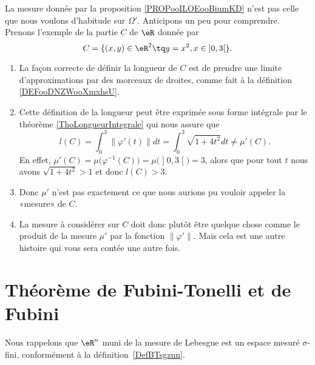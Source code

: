 \begin{remark}     \label{REMooOMYYooNFiKOs}
    La mesure donnée par la proposition \ref{PROPooILOEooBiumKD} n'est pas celle que nous voulons d'habitude sur \( \Omega'\). Anticipons un peu pour comprendre. Prenons l'exemple de la partie \( C\) de \( \eR\) donnée par
    \begin{equation}
        C=\{ (x,y)\in \eR^2\tq y=x^2,x\in \mathopen] 0 , 3 \mathclose[ \}.
    \end{equation}
    \begin{enumerate}
        \item
            La façon correcte de définir la longueur de \( C\) est de prendre une limite d'approximations par des morceaux de droites, comme fait à la définition \ref{DEFooDNZWooXmxhsU}.
        \item
            Cette définition de la longueur peut être exprimée sous forme intégrale par le théorème \ref{ThoLongueurIntegrale} qui nous assure que
            \begin{equation}
                l(C)=\int_0^3\| \varphi'(t) \|dt=\int_0^3\sqrt{ 1+4t^2 }dt\neq \mu'(C).
            \end{equation}
        En effet, \( \mu'(C)=\mu\big( \varphi^{-1}(C) \big)=\mu\big( \mathopen] 0 , 3 \mathclose[ \big)=3\), alors que pour tout \( t\) nous avons \( \sqrt{ 1+4t^2 }>1\) et donc \( l(C)>3\).
        \item
            Donc \( \mu'\) n'est pas exactement ce que nous aurions pu vouloir appeler la «mesure» de \( C\).
        \item
            La mesure à considérer sur \( C\) doit donc plutôt être quelque chose comme le produit de la mesure \( \mu'\) par la fonction \( \| \varphi' \|\). Mais cela est une autre histoire qui vous sera contée une autre fois.
    \end{enumerate}
\end{remark}

\section{Théorème de Fubini-Tonelli et de Fubini}

Nous rappelons que \( \eR^n\) muni de la mesure de Lebesgue est un espace mesuré \( \sigma\)-fini, conformément à la définition~\ref{DefBTsgznn}.

